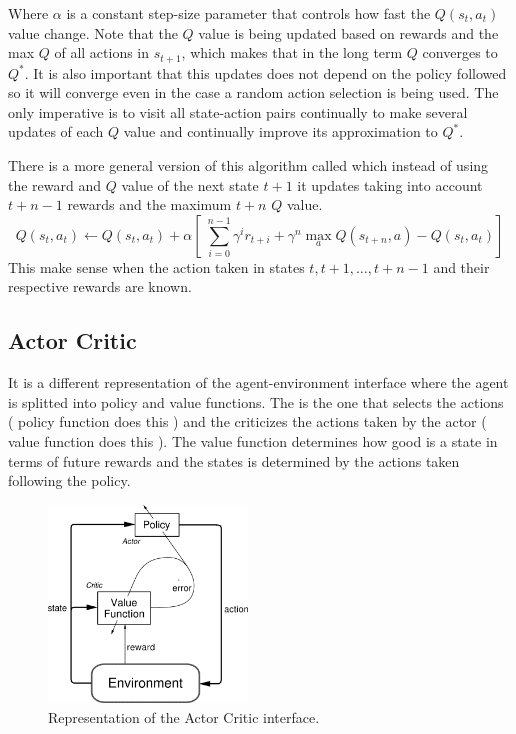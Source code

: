 Where $\alpha$ is a constant step-size parameter that controls how fast the $Q(s_t, a_t)$ value change. Note that the $Q$ value is being updated based on rewards and the max $Q$ of all actions in $s_{t+1}$, which makes that in the long term $Q$ converges to $Q^*$. It is also important that this updates does not depend on the policy followed so it will converge even in the case a random action selection is being used. The only imperative is to visit all state-action pairs continually to make several updates of each $Q$ value and continually improve its approximation to $Q^*$.

There is a more general version of this algorithm called  which instead of using the reward and $Q$ value of the next state $t+1$ it updates taking into account $t+n-1$ rewards and the maximum $t+n$ $Q$ value.
\begin{equation}
    Q(s_t,a_t)\leftarrow Q(s_t,a_t) + \alpha [\;\sum^{n-1}_{i=0}\gamma^i r_{t+i} + \gamma^n \max_a Q(s_{t+n},a) - Q(s_t,a_t)]
\end{equation}
This make sense when the action taken in states $t, t+1,\dots , t+n-1$ and their respective rewards are known.

\subsection{Actor Critic\label{subsec:AC}}
It is a different representation of the agent-environment interface where the agent is splitted into policy and value
functions. The  is the one that selects the actions ( policy function does this ) and the
 criticizes the actions taken by the actor ( value function does this ). The value function
determines how good is a state in terms of future rewards and the states is determined by the actions taken following the policy.

\begin{figure}[hbtp]
\begin{center}
\includegraphics[width=200]{img/actor_critic.png}
\end{center}
\caption[Actor Critic diagram]
{Representation of the Actor Critic interface.}
\label{fig:AC}
\end{figure}

